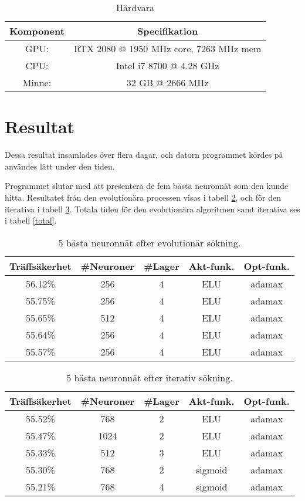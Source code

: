 \documentclass[a4paper, 12pt]{article}
\begin{document}
\begin{table}[H]
    \centering
    \begin{tabular}{c|c}
      Komponent & Specifikation \\
      \hline
      GPU: & RTX 2080 @ 1950 MHz core, 7263 MHz mem \\
      CPU: & Intel i7 8700 @ 4.28 GHz \\
      Minne: & 32 GB @ 2666 MHz \\
    \end{tabular}
    \caption{Hårdvara}
    \label{hårdvara}
\end{table}

  \section{Resultat}

  Dessa resultat insamlades över flera dagar, och datorn programmet kördes på användes lätt under den tiden.

  Programmet slutar med att presentera de fem bästa neuronnät som den kunde hitta. Resultatet från den evolutionära processen visas i tabell \ref{evo}, och för den iterativa i tabell \ref{iterativ}. Totala tiden för den evolutionära algoritmen samt iterativa ses i tabell \ref{total}.

\begin{table}[H]
    \centering
    \begin{tabular}{c|c|c|c|c}
      Träffsäkerhet & \#Neuroner & \#Lager & Akt-funk. & Opt-funk. \\
      \hline
      56.12\% & 256 & 4 & ELU & adamax \\
      55.75\% & 256 & 4 & ELU & adamax \\
      55.65\% & 512 & 4 & ELU & adamax \\
      55.64\% & 256 & 4 & ELU & adamax \\
      55.57\% & 256 & 4 & ELU & adamax \\
    \end{tabular}
    \caption{5 bästa neuronnät efter evolutionär sökning.}
    \label{evo}
\end{table}

\begin{table}[H]
    \centering
    \begin{tabular}{c|c|c|c|c}
        Träffsäkerhet & \#Neuroner & \#Lager & Akt-funk. & Opt-funk. \\
        \hline
        55.52\% & 768 & 2 & ELU & adamax \\
        55.47\% & 1024 & 2 & ELU & adamax \\
        55.33\% & 512 & 3 & ELU & adamax \\
        55.30\% & 768 & 2 & sigmoid & adamax \\
        55.21\% & 768 & 4 & sigmoid & adamax \\
    \end{tabular}
    \caption{5 bästa neuronnät efter iterativ sökning.}
    \label{iterativ}
\end{table}
\end{document}
